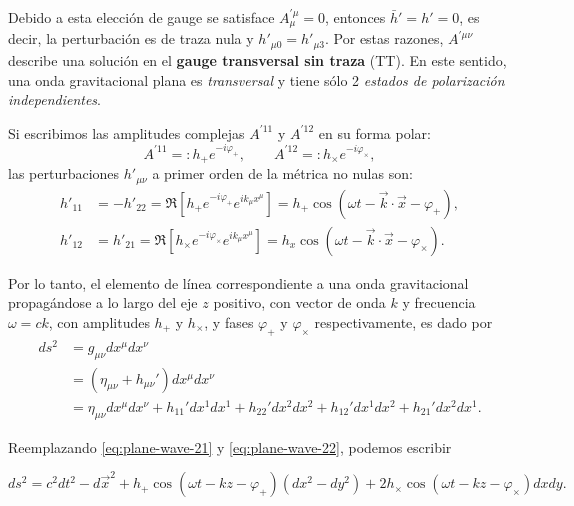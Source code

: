 \documentclass[letterpaper,11pt]{article}
\begin{document}
Debido a esta elección de gauge se satisface $A_{\mu}^{'\mu} = 0$, entonces $\bar{h}' = h' = 0$, es decir, la perturbación es de traza nula y $h'_{\mu 0} = h'_{\mu 3}$. Por estas razones, $A^{'\mu\nu}$ describe una solución en el \textbf{gauge transversal sin traza} (TT). En este sentido, una onda gravitacional plana es \textit{transversal} y tiene sólo 2 \textit{estados de polarización independientes}. 

Si escribimos las amplitudes complejas $A^{'11}$ y $A^{'12}$ en su forma polar:
\begin{equation}
A^{'11} =: h_{+} e^{-i\varphi_{+}}, \qquad A^{'12} =: h_{\times} e^{-i\varphi_{\times}},
\end{equation}
las perturbaciones $h'_{\mu\nu}$ a primer orden de la métrica no nulas son:
\begin{align}
h'_{11} &= - h'_{22} = \Re\left[ h_{+} e^{-i\varphi_{+}} e^{ik_{\mu} x^{\mu}} \right] = h_{+} \cos(\omega t - \vec{k} \cdot \vec{x} - \varphi_{+}), \label{eq:plane-wave-21}\\
h'_{12} &= h'_{21} = \Re\left[ h_{\times} e^{-i\varphi_{\times}} e^{ik_{\mu} x^{\mu}} \right] = h_{x} \cos(\omega t - \vec{k} \cdot \vec{x} - \varphi_{\times}).\label{eq:plane-wave-22}
\end{align} 

Por lo tanto, el elemento de línea correspondiente a una onda gravitacional propagándose a lo largo del eje $z$ positivo, con vector de  onda $k$ y frecuencia $\omega = ck$, con amplitudes $h_{+}$ y $h_{\times}$, y fases $\varphi_{+}$ y $\varphi_{\times}$ respectivamente, es dado por 
\begin{align}
ds^2 &= g_{\mu\nu} dx^{\mu} dx^{\nu} \nonumber \\
&= \left(\eta_{\mu\nu} + h_{\mu\nu}' \right) dx^{\mu} dx^{\nu} \nonumber \\
&= \eta_{\mu\nu} dx^{\mu} dx^{\nu} +  h_{11}' dx^{1}dx^{1} + h_{22}' dx^{2}dx^{2} + h_{12}' dx^{1} dx^{2} + h_{21}' dx^{2} dx^{1}.
\end{align}

Reemplazando \eqref{eq:plane-wave-21} y \eqref{eq:plane-wave-22}, podemos escribir
\begin{shaded}
\begin{equation}
ds^2 = c^2dt^2 - d\vec{x}^2 + h_{+}\cos(\omega t - kz - \varphi_{+})(dx^2 - dy^2) + 2h_{\times} \cos(\omega t - kz - \varphi_{\times}) dxdy. \label{eq:plane-wave-23}
\end{equation}
\end{shaded}
\end{document}
